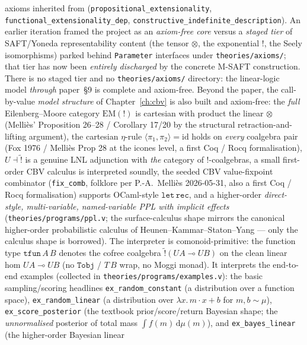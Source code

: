 axioms inherited from \mathcompA{}
(\texttt{propositional\_extensionality},
\texttt{functional\_extensionality\_dep},
\texttt{constructive\_indefinite\_description}). An earlier iteration
framed the project as an \emph{axiom-free core} versus a \emph{staged
tier} of SAFT/Yoneda representability content (the tensor $\otimes$, the
exponential $\mathord{!}$, the Seely isomorphisms) parked behind
\texttt{Parameter} interfaces under \texttt{theories/axioms/}; that tier
has now been \emph{entirely discharged} by the concrete M-SAFT
construction. There is no staged tier and no \texttt{theories/axioms/}
directory: the linear-logic model \emph{through} paper~\S9 is complete
and axiom-free. Beyond the paper, the call-by-value \emph{model
structure} of Chapter~\ref{ch:cbv} is also built and axiom-free: the
\emph{full} Eilenberg--Moore category $\mathrm{EM}(\mathord{!})$ is
cartesian with product the linear $\otimes$ (Melli\`es' Proposition
26--28 / Corollary 17/20 by the structural retraction-and-lifting
argument), the cartesian $\eta$-rule
$\langle \pi_1, \pi_2 \rangle = \mathrm{id}$ holds on \emph{every}
coalgebra pair (Fox 1976 / Melli\`es Prop 28 at the icones level, a
first Coq / Rocq formalisation),
$U \dashv \widetilde{\mathord{!}}$ is a genuine LNL
adjunction with \emph{the} category of $\mathord{!}$-coalgebras, a small
first-order CBV calculus is interpreted soundly, the seeded CBV
value-fixpoint combinator (\texttt{fix\_comb}, folklore per
P.-A.~Melli\`es 2026-05-31, also a first Coq / Rocq formalisation)
supports OCaml-style $\mathtt{let\,rec}$, and a higher-order
\emph{direct-style, multi-variable, named-variable PPL with
implicit effects} (\texttt{theories/programs/ppl.v}; the
surface-calculus shape mirrors the canonical higher-order
probabilistic calculus of Heunen--Kammar--Staton--Yang --- only the
calculus shape is borrowed). The interpreter is comonoid-primitive: the
function type $\mathtt{tfun}\,A\,B$ denotes the cofree coalgebra
$\widetilde{\mathord{!}}(U A \multimap U B)$ on the clean linear hom
$U A \multimap U B$ (no $\mathtt{Tobj}$ / $T\,B$ wrap, no Moggi monad).
It interprets the
end-to-end examples (collected in
\texttt{theories/programs/examples.v}): the basic sampling/scoring
headlines
\texttt{ex\_random\_constant} (a distribution over a
function space), \texttt{ex\_random\_linear} (a
distribution over $\lambda x.\,m\cdot x + b$ for $m, b \sim \mu$),
\texttt{ex\_score\_posterior} (the textbook prior/score/return
Bayesian shape; the \emph{unnormalised} posterior of
total mass $\int f(m)\,\mathrm{d}\mu(m)$), and
\texttt{ex\_bayes\_linear} (the higher-order Bayesian linear
